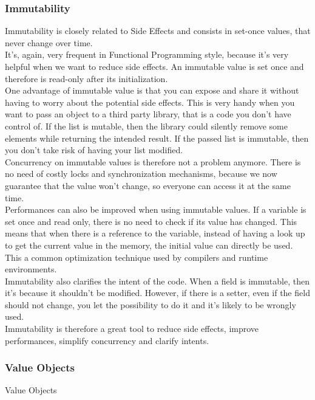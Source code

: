 \subsubsection{Immutability}
Immutability is closely related to Side Effects and consists in set-once
values, that never change over time. \\
It's, again, very frequent in Functional Programming style, because
it's very helpful when we want to reduce side effects.
An immutable value is set once and therefore is read-only after its
initialization. \\
\newline
One advantage of immutable value is that you can expose and share
it without having to worry about the potential side effects.
This is very handy when you want to pass an object to a third party
library, that is a code you don't have control of.
If the list is mutable, then the library could silently remove some
elements while returning the intended result.
If the passed list is immutable, then you don't take risk of having your
list modified. \\
\newline
Concurrency on immutable values is therefore not a problem anymore.
There is no need of costly locks and synchronization mechanisms, because
we now guarantee that the value won't change, so everyone can access it
at the same time. \\
\newline
Performances can also be improved when using immutable values.
If a variable is set once and read only, there is no need to check if
its value has changed.
This means that when there is a reference to the variable, instead of
having a look up to get the current value in the memory, the initial value
can directly be used.
This a common optimization technique used by compilers and runtime
environments. \\
\newline
Immutability also clarifies the intent of the code.
When a field is immutable, then it's because it shouldn't be modified.
However, if there is a setter, even if the field should not change,
you let the possibility to do it and it's likely to be wrongly used. \\
\newline
Immutability is therefore a great tool to reduce side effects, improve
performances, simplify concurrency and clarify intents.

\subsubsection{Value Objects}
Value Objects


